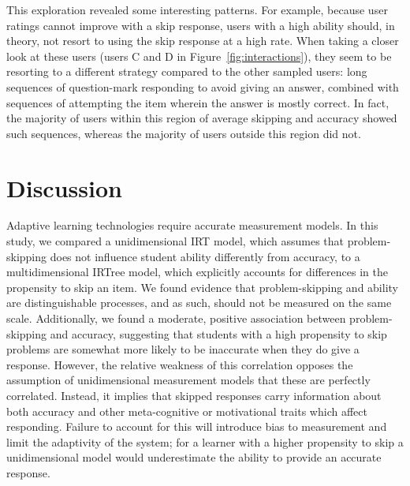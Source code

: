 \documentclass[11pt]{article}
\begin{document}
This exploration revealed some interesting patterns. For example, because user ratings cannot improve with a skip response, users with a high ability should, in theory, not resort to using the skip response at a high rate. When taking a closer look at these users (users C and D in Figure~\ref{fig:interactions}), they seem to be resorting to a different strategy compared to the other sampled users: long sequences of question-mark responding to avoid giving an answer, combined with sequences of attempting the item wherein the answer is mostly correct. In fact, the majority of users within this region of average skipping and accuracy showed such sequences, whereas the majority of users outside this region did not. 
 
\section{Discussion}

Adaptive learning technologies require accurate measurement models. In this study, we compared a unidimensional IRT model, which assumes that problem-skipping does not influence student ability differently from accuracy, to a multidimensional IRTree model, which explicitly accounts for differences in the propensity to skip an item. We found evidence that problem-skipping and ability are distinguishable processes, and as such, should not be measured on the same scale. Additionally, we found a moderate, positive association between problem-skipping and accuracy, suggesting that students with a high propensity to skip problems are somewhat more likely to be inaccurate when they do give a response. However, the relative weakness of this correlation opposes the assumption of unidimensional measurement models that these are perfectly correlated. Instead, it implies that skipped responses carry information about both accuracy and other meta-cognitive or motivational traits which affect responding. Failure to account for this will introduce bias to measurement and limit the adaptivity of the system; for a learner with a higher propensity to skip a unidimensional model would underestimate the ability to provide an accurate response.
\end{document}
